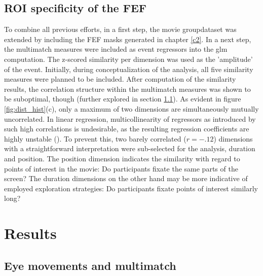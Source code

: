 \documentclass[a4paper, 12pt]{scrreprt}
\begin{document}
\subsection{ROI specificity of the FEF}\label{c3:FEF}

To combine all previous efforts, in a first step, the movie groupdataset was extended by including the FEF masks generated in chapter \ref{c2}. In a next step, the multimatch measures were included as event regressors into the glm computation. The z-scored similarity per dimension was used as the 'amplitude' of the event. Initially, during conceptualization of the analysis, all five similarity measures were planned to be included. After computation of the similarity results, the correlation structure within the multimatch measures was shown to be suboptimal, though (further explored in section \ref{sec:res_mm}). As evident in figure \ref{fig:dist_hist}(c), only a maximum of two dimensions are simultaneously mutually uncorrelated. In linear regression, multicollinearity of regressors as introduced by such high correlations is undesirable, as the resulting regression coefficients are highly unstable (\cite{wickens2014geometry}). To prevent this, two barely correlated ($r = -.12$) dimensions with a straightforward interpretation were sub-selected for the analysis, duration and position. The position dimension indicates the similarity with regard to points of interest in the movie: Do participants fixate the same parts of the screen? The duration dimensions on the other hand may be more indicative of employed exploration strategies: Do participants fixate points of interest similarly long?


\section{Results}

\subsection{Eye movements and multimatch}\label{sec:res_mm}
\end{document}
